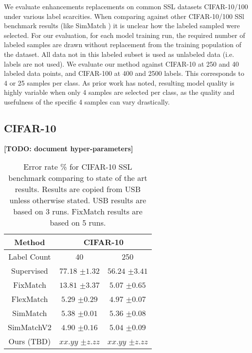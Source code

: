 \documentclass[10pt,twocolumn,letterpaper]{article}
\newcommand{\TODO}[1]{\textbf{\color{red}[TODO: #1]}}
\begin{document}
We evaluate enhancements replacements on common SSL datasets CIFAR-10/100 \cite{cifar10} under various label scarcities. 
When comparing against other CIFAR-10/100 SSl benchmark results (like SimMatch \cite{zheng2022simmatch}) it is unclear how the labeled sampled were selected. 
For our evaluation, for each model training run, the required number of labeled samples are drawn without replacement from the training population of the dataset.
All data not in this labeled subset is used as unlabeled data (i.e. labels are not used).
We evaluate our method against CIFAR-10 at 250 and 40 labeled data points, and CIFAR-100 at 400 and 2500 labels. 
This corresponds to 4 or 25 samples per class.
As prior work \cite{sohn2020fixmatch} has noted, resulting model quality is highly variable when only 4 samples are selected per class, as the quality and usefulness of the specific 4 samples can vary drastically. 



\subsection{CIFAR-10}

\TODO {document hyper-parameters}

\begin{table}[htbp]
	\begin{tabular}{c|cc}
		Method          & \multicolumn{2}{c}{CIFAR-10} \\ \hline
		Label Count     & 40            & 250           \\
		Supervised & $77.18$ \scriptsize{$\pm1.32$}   & $56.24$ \scriptsize{$\pm3.41$}   \\ \hline
		FixMatch   & $13.81$ \scriptsize{$\pm3.37$}   & $5.07$ \scriptsize{$\pm0.65$}     \\
		FlexMatch  & $5.29$ \scriptsize{$\pm0.29$}    & $4.97$ \scriptsize{$\pm0.07$}    \\
		SimMatch   & $5.38$ \scriptsize{$\pm0.01$}    & $5.36$ \scriptsize{$\pm0.08$}    \\
		SimMatchV2 & $4.90$ \scriptsize{$\pm0.16$}    & $5.04$ \scriptsize{$\pm0.09$}    \\ \hline
		Ours (TBD)                            & $xx.yy$ \scriptsize{$\pm z.zz$}           & $xx.yy$ \scriptsize{$\pm z.zz$}           
	\end{tabular}
	\caption{Error rate \% for CIFAR-10 SSL benchmark comparing to state of the art results. Results are copied from USB \cite{wang2022usb} unless otherwise stated. USB results are based on 3 runs. FixMatch \cite{sohn2020fixmatch} results are based on 5 runs.}
	\label{table2}
\end{table}
\end{document}
